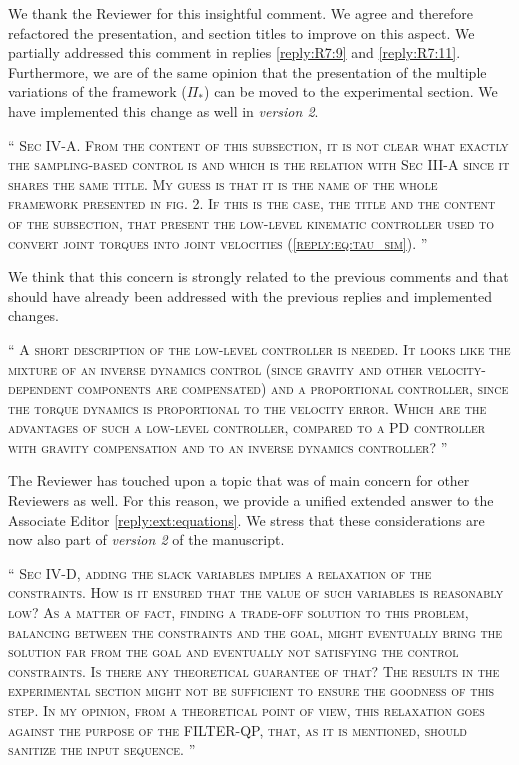 \documentclass[10pt]{article}
\newcommand{\referee}[1]{\;
  \begin{minipage}[t]{.95\textwidth}
    ``{\small\color{red} \textsc{#1}}''
  \end{minipage}\medskip
  }
\newcommand{\version}[1]{\textit{version #1}}
\begin{document}
\begin{enumerate}[label={[R7:\,\arabic{enumi}]}]
We thank the Reviewer for this insightful comment. We agree and therefore refactored the presentation,  and section titles to improve on this aspect. We partially addressed this comment in replies \ref{reply:R7:9} and \ref{reply:R7:11}. Furthermore, we are of the same opinion that the presentation of the multiple variations of the framework ($\Pi_*$) can be moved to the experimental section. We have implemented this change as well in \version{2}.


\item\label{reply:R7:15} 
\referee{Sec IV-A. From the content of this subsection, it is not clear what exactly the sampling-based control is and which is the relation with Sec III-A since it shares the same title. My guess is that it is the name of the whole framework presented in fig. 2. If this is the case, the title and the content of the subsection, that present the low-level kinematic controller used to convert joint torques into joint velocities (\eqref{reply:eq:tau_sim}).
}

We think that this concern is strongly related to the previous comments and that should have already been addressed with the previous replies and implemented changes.

\item\label{reply:R7:16} 
\referee{A short description of the low-level controller is needed. It looks like the mixture of an inverse dynamics control (since gravity and other velocity-dependent components are compensated) and a proportional controller, since the torque dynamics is proportional to the velocity
error. Which are the advantages of such a low-level controller, compared to a PD controller with gravity compensation and to an inverse dynamics controller?
}

The Reviewer has touched upon a topic that was of main concern for other Reviewers as well. For this reason, we provide a unified extended answer to the Associate Editor \ref{reply:ext:equations}. We stress that these considerations are now also part of \version{2} of the manuscript.

\item\label{reply:R7:17} 
\referee{Sec IV-D,  adding the slack variables implies a relaxation of the constraints. How is it ensured that the value of such variables is reasonably low? As a matter of fact, finding a trade-off solution to this problem, balancing between the constraints and the goal, might eventually bring the solution far from the goal and eventually not satisfying the control constraints. Is there any theoretical guarantee of that? The results in the experimental section might not be sufficient to ensure the goodness of this step. In my opinion, from a theoretical point of view, this relaxation goes against the purpose of the FILTER-QP, that, as it is mentioned, should sanitize the input sequence.
}


\end{enumerate}
\end{document}
